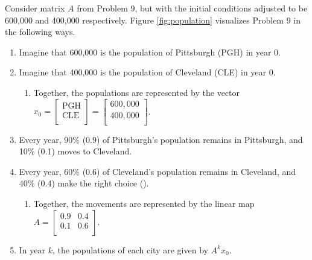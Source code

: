 \documentclass[titlepage]{article}
\begin{document}
Consider matrix $A$ from Problem 9, but with the initial conditions adjusted to be 600,000 and 400,000 respectively. Figure \ref{fig:population} visualizes Problem 9 in the following ways.
\begin{enumerate}[itemsep=0pt]
    \item Imagine that 600,000 is the population of Pittsburgh (PGH) in year 0.
    \item Imagine that 400,000 is the population of Cleveland (CLE) in year 0.
    \begin{enumerate}
        \item Together, the populations are represented by the vector $
            x_0 =
            \begin{bmatrix}
                \text{PGH}\\
                \text{CLE}\\
            \end{bmatrix}
            =
            \begin{bmatrix}
                600,000\\
                400,000\\
            \end{bmatrix}
        $.
    \end{enumerate}
    \item Every year, 90\% (0.9) of Pittsburgh's population remains in Pittsburgh, and 10\% (0.1) moves to Cleveland.
    \item Every year, 60\% (0.6) of Cleveland's population remains in Cleveland, and 40\% (0.4) make the right choice (\smiley{}).
    \begin{enumerate}
        \item Together, the movements are represented by the linear map $
            A =
            \begin{bmatrix}
                0.9 & 0.4\\
                0.1 & 0.6\\
            \end{bmatrix}
        $.
    \end{enumerate}
    \item In year $k$, the populations of each city are given by $A^kx_0$.
\end{enumerate}
\end{document}
